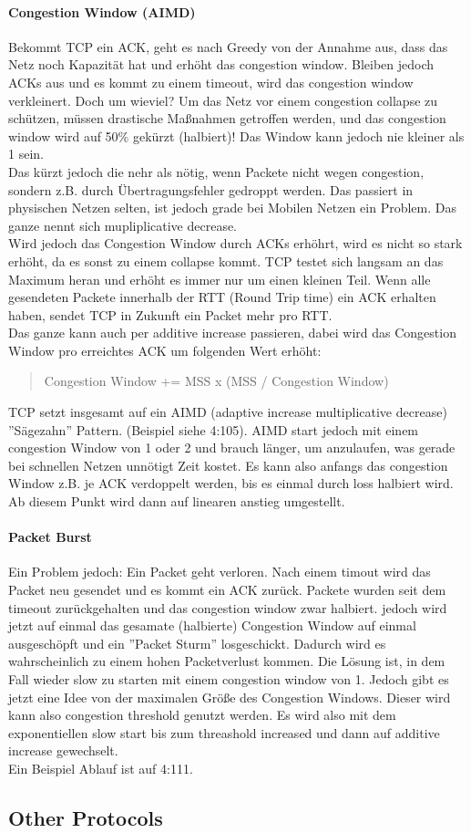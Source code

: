 			\paragraph{Congestion Window (AIMD)}
				Bekommt TCP ein ACK, geht es nach Greedy von der Annahme aus, dass das Netz noch Kapazität hat und erhöht das congestion window. Bleiben jedoch ACKs aus und es kommt zu einem timeout, wird das congestion window verkleinert. Doch um wieviel? Um das Netz vor einem congestion collapse zu schützen, müssen drastische Maßnahmen getroffen werden, und das congestion window wird auf 50\% gekürzt (halbiert)! Das Window kann jedoch nie kleiner als 1 sein. \\
				Das kürzt jedoch die nehr als nötig, wenn Packete nicht wegen congestion, sondern z.B. durch Übertragungsfehler gedroppt werden. Das passiert in physischen Netzen selten, ist jedoch grade bei Mobilen Netzen ein Problem. Das ganze nennt sich mupliplicative decrease. \\
				Wird jedoch das Congestion Window durch ACKs erhöhrt, wird es nicht so stark erhöht, da es sonst zu einem collapse kommt. TCP testet sich langsam an das Maximum heran und erhöht es immer nur um einen kleinen Teil. Wenn alle gesendeten Packete innerhalb der RTT (Round Trip time) ein ACK erhalten haben, sendet TCP in Zukunft ein Packet mehr pro RTT. \\
				Das ganze kann auch per additive increase passieren, dabei wird das Congestion Window pro erreichtes ACK um folgenden Wert erhöht:
				\begin{quote}
					Congestion Window += MSS x (MSS / Congestion Window)
				\end{quote}
				TCP setzt insgesamt auf ein AIMD (adaptive increase multiplicative decrease) ''Sägezahn'' Pattern. (Beispiel siehe 4:105). AIMD start jedoch mit einem congestion Window von 1 oder 2 und brauch länger, um anzulaufen, was gerade bei schnellen Netzen unnötigt Zeit kostet. Es kann also anfangs das congestion Window z.B. je ACK verdoppelt werden, bis es einmal durch loss halbiert wird. Ab diesem Punkt wird dann auf linearen anstieg umgestellt. 
			\paragraph{Packet Burst}
				Ein Problem jedoch: Ein Packet geht verloren. Nach einem timout wird das Packet neu gesendet und es kommt ein ACK zurück. Packete wurden seit dem timeout zurückgehalten und das congestion window zwar halbiert. jedoch wird jetzt auf einmal das gesamate (halbierte) Congestion Window auf einmal ausgeschöpft und ein ''Packet Sturm'' losgeschickt. Dadurch wird es wahrscheinlich zu einem hohen Packetverlust kommen. Die Lösung ist, in dem Fall wieder slow zu starten mit einem congestion window von 1. Jedoch gibt es jetzt eine Idee von der maximalen Größe des Congestion Windows. Dieser wird kann also congestion threshold genutzt werden. Es wird also mit dem exponentiellen slow start bis zum threashold increased und dann auf additive increase gewechselt. \\
				Ein Beispiel Ablauf ist auf 4:111.
	
	\subsection{Other Protocols}